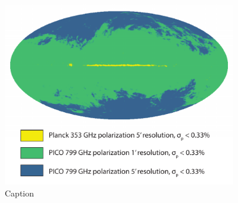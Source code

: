 \documentclass[PICOReport.tex]{subfiles}
\begin{document}
\begin{figure}
    \centering
    \includegraphics[width=4in]{images/Allsky_dust_fig.pdf}
    \caption{Caption}
    \label{fig:allsky}
\end{figure}
\end{document}
